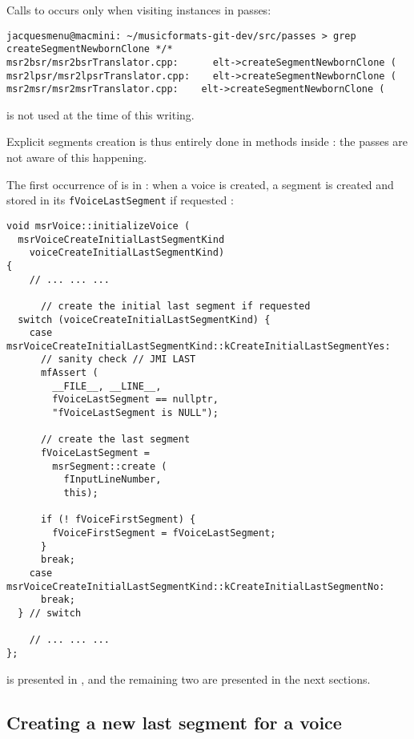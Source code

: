 Calls to  occurs only when visiting  instances in passes:
\begin{lstlisting}[language=Terminal]
jacquesmenu@macmini: ~/musicformats-git-dev/src/passes > grep createSegmentNewbornClone */*
msr2bsr/msr2bsrTranslator.cpp:      elt->createSegmentNewbornClone (
msr2lpsr/msr2lpsrTranslator.cpp:    elt->createSegmentNewbornClone (
msr2msr/msr2msrTranslator.cpp:    elt->createSegmentNewbornClone (
\end{lstlisting}

 is not used at the time of this writing.

Explicit segments creation is thus entirely done in methods inside : the passes are not aware of this happening.

The first occurrence of  is in : when a voice is created, a segment is created and stored in its {\tt fVoiceLastSegment} if requested :
\begin{lstlisting}[language=CPlusPlus]
void msrVoice::initializeVoice (
  msrVoiceCreateInitialLastSegmentKind
    voiceCreateInitialLastSegmentKind)
{
	// ... ... ...

	  // create the initial last segment if requested
  switch (voiceCreateInitialLastSegmentKind) {
    case msrVoiceCreateInitialLastSegmentKind::kCreateInitialLastSegmentYes:
      // sanity check // JMI LAST
      mfAssert (
        __FILE__, __LINE__,
        fVoiceLastSegment == nullptr,
        "fVoiceLastSegment is NULL");

      // create the last segment
      fVoiceLastSegment =
        msrSegment::create (
          fInputLineNumber,
          this);

      if (! fVoiceFirstSegment) {
        fVoiceFirstSegment = fVoiceLastSegment;
      }
      break;
    case msrVoiceCreateInitialLastSegmentKind::kCreateInitialLastSegmentNo:
      break;
  } // switch

	// ... ... ...
};
\end{lstlisting}

 is presented in , and the remaining two are presented in the next sections.


\subsection{Creating a new last segment for a voice}

